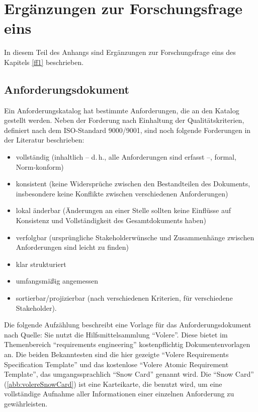\chapter{Ergänzungen zur Forschungsfrage eins} \label{appendixFF1}
In diesem Teil des Anhangs sind Ergänzungen zur Forschungsfrage eins des Kapitels \vref{ff1} beschrieben.

\section{Anforderungsdokument}\label{appendixAnforderung}

Ein Anforderungskatalog hat bestimmte Anforderungen, die an den Katalog gestellt werden. Neben der Forderung nach Einhaltung der Qualitätskriterien, definiert nach dem ISO-Standard 9000/9001, sind noch folgende Forderungen in der Literatur beschrieben: \autocite[sig.][S.\,34]{partsch_requirements-engineering_2010}

\begin{itemize}
	\item vollständig (inhaltlich – d.\,h., alle Anforderungen sind erfasst –, formal, Norm-konform)
	\item konsistent (keine Widersprüche zwischen den Bestandteilen des Dokuments,
	insbesondere keine Konflikte zwischen verschiedenen Anforderungen)
	\item lokal änderbar (Änderungen an einer Stelle sollten keine Einflüsse auf Konsistenz und Vollständigkeit des Gesamtdokuments haben)
	\item verfolgbar (ursprüngliche Stakeholderwünsche und Zusammenhänge zwischen
	Anforderungen sind leicht zu finden)
	\item klar strukturiert
	\item umfangsmäßig angemessen
	\item sortierbar/projizierbar (nach verschiedenen Kriterien, für verschiedene Stakeholder).
\end{itemize}

Die folgende Aufzählung beschreibt eine Vorlage für das Anforderungsdokument nach Quelle: Sie nutzt die Hilfsmittelsammlung \enquote{Volere}. Diese bietet im Themenbereich \enquote{requirements engineering} kostenpflichtig Dokumentenvorlagen an. Die beiden Bekanntesten sind die hier gezeigte \enquote{Volere Requirements Specification Template} und das kostenlose \enquote{Volere Atomic Requirement Template}, das umgangssprachlich \enquote{Snow Card} genannt wird. Die \enquote{Snow Card} (\vref{abb:volereSnowCard}) ist eine Karteikarte, die benutzt wird, um eine vollständige Aufnahme aller Informationen einer einzelnen Anforderung zu gewährleisten.\autocite[vgl.][]{VolereSnowCard} 

